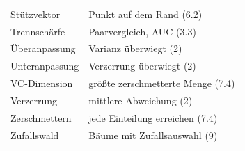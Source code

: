 \begin{merksatz}
\begin{center}
{\begin{longtable}{@{}P{3.6cm}P{5.0cm}@{}}
Stützvektor & Punkt auf dem Rand (6.2)\\
Trennschärfe & Paarvergleich, AUC (3.3)\\
Überanpassung & Varianz überwiegt (2)\\
Unteranpassung & Verzerrung überwiegt (2)\\
VC-Dimension & größte zerschmetterte Menge (7.4)\\
Verzerrung & mittlere Abweichung (2)\\
Zerschmettern & jede Einteilung erreichen (7.4)\\
Zufallswald & Bäume mit Zufallsauswahl (9)\\
\bottomrule
\end{longtable}}
\end{center}
\end{merksatz}
